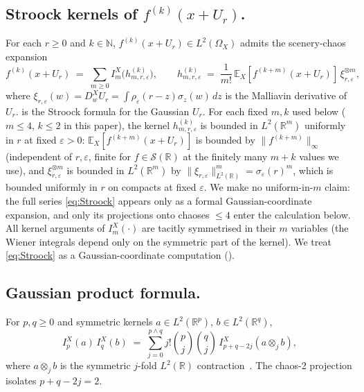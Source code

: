 \documentclass[11pt,reqno]{amsart}
\theoremstyle{plain}
\theoremstyle{definition}
\theoremstyle{remark}
\newcommand{\R}{\mathbb{R}}
\newcommand{\N}{\mathbb{N}}
\newcommand{\E}{\mathbb{E}}
\begin{document}
\subsection*{Stroock kernels of \texorpdfstring{$f^{(k)}(x+U_r)$}{f\^{}(k)(x+U\_r)}.}
For each $r\ge 0$ and $k\in\N$, $f^{(k)}(x+U_r)\in L^{2}(\Omega_X)$
admits the scenery-chaos expansion
\begin{equation}\label{eq:Stroock}
 f^{(k)}(x+U_r)\;=\;\sum_{m\ge 0}I_m^X\!\bigl(h^{(k)}_{m,r,\varepsilon}\bigr),
\qquad
 h^{(k)}_{m,r,\varepsilon}\;=\;\frac{1}{m!}\,\E_X[f^{(k+m)}(x+U_r)]\,
   \xi_{r,\varepsilon}^{\otimes m},
\end{equation}
where $\xi_{r,\varepsilon}(w)=D^X_w U_r=\int\rho_\varepsilon(r-z)\sigma_z(w)\,dz$
is the Malliavin derivative of $U_r$.  is the
Stroock formula for the Gaussian $U_r$. For each fixed $m,k$ used
below ($m\le 4$, $k\le 2$ in this paper), the kernel
$h^{(k)}_{m,r,\varepsilon}$ is bounded in $L^{2}(\R^m)$ uniformly in
$r$ at fixed $\varepsilon>0$: $\E_X[f^{(k+m)}(x+U_r)]$ is bounded by
$\|f^{(k+m)}\|_\infty$ (independent of $r,\varepsilon$, finite for
$f\in\mathscr S(\R)$ at the finitely many $m+k$ values we use), and
$\xi_{r,\varepsilon}^{\otimes m}$ is bounded in $L^{2}(\R^m)$ by
$\|\xi_{r,\varepsilon}\|_{L^{2}(\R)}^m=\sigma_\varepsilon(r)^m$,
which is bounded uniformly in $r$ on compacts at fixed $\varepsilon$.
We make no uniform-in-$m$ claim: the full series \eqref{eq:Stroock}
appears only as a formal Gaussian-coordinate expansion, and only its
projections onto chaoses $\le 4$ enter the calculation below.
All kernel arguments of $I_m^X(\cdot)$ are tacitly symmetrised in
their $m$ variables (the Wiener integrals depend only on the
symmetric part of the kernel). We treat \eqref{eq:Stroock} as a
Gaussian-coordinate computation ().

\subsection*{Gaussian product formula.}
For $p,q\ge 0$ and symmetric kernels $a\in L^2(\R^p)$,
$b\in L^2(\R^q)$,
\begin{equation}\label{eq:prod-formula}
 I_p^X(a)\,I_q^X(b)\;=\;\sum_{j=0}^{p\wedge q}j!\binom{p}{j}\binom{q}{j}
 \,I_{p+q-2j}^X(a\otimes_j b),
\end{equation}
where $a\otimes_j b$ is the symmetric $j$-fold $L^{2}(\R)$
contraction~\cite[Sec.\ 1.1.3]{Nualart}. The chaos-2 projection
isolates $p+q-2j=2$.
\end{document}
